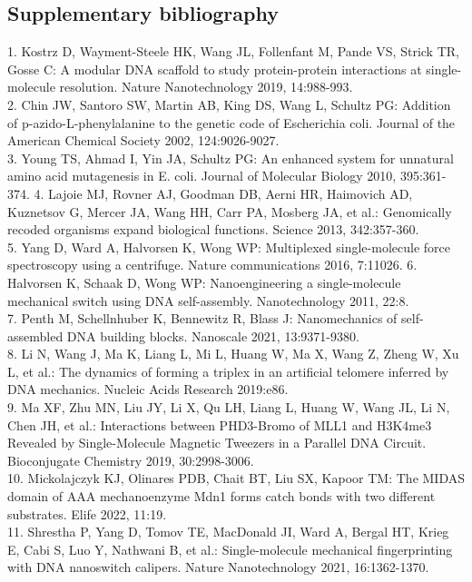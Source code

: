 \documentclass{biophys-new}
\begin{document}
\FloatBarrier

\newpage

\subsection*{Supplementary bibliography}

1. Kostrz D, Wayment-Steele HK, Wang JL, Follenfant M, Pande VS, Strick TR, Gosse C: A modular DNA scaffold to study protein-protein interactions at single-molecule resolution. Nature Nanotechnology 2019, 14:988-993.\\
2. Chin JW, Santoro SW, Martin AB, King DS, Wang L, Schultz PG: Addition of p-azido-L-phenylalanine to the genetic code of Escherichia coli. Journal of the American Chemical Society 2002, 124:9026-9027.\\
3. Young TS, Ahmad I, Yin JA, Schultz PG: An enhanced system for unnatural amino acid mutagenesis in E. coli. Journal of Molecular Biology 2010, 395:361-374.
4. Lajoie MJ, Rovner AJ, Goodman DB, Aerni HR, Haimovich AD, Kuznetsov G, Mercer JA, Wang HH, Carr PA, Mosberg JA, et al.: Genomically recoded organisms expand biological functions. Science 2013, 342:357-360.\\
5. Yang D, Ward A, Halvorsen K, Wong WP: Multiplexed single-molecule force spectroscopy using a centrifuge. Nature communications 2016, 7:11026.
6. Halvorsen K, Schaak D, Wong WP: Nanoengineering a single-molecule mechanical switch using DNA self-assembly. Nanotechnology 2011, 22:8.\\
7. Penth M, Schellnhuber K, Bennewitz R, Blass J: Nanomechanics of self-assembled DNA building blocks. Nanoscale 2021, 13:9371-9380.\\
8. Li N, Wang J, Ma K, Liang L, Mi L, Huang W, Ma X, Wang Z, Zheng W, Xu L, et al.: The dynamics of forming a triplex in an artificial telomere inferred by DNA mechanics. Nucleic Acids Research 2019:e86.\\
9. Ma XF, Zhu MN, Liu JY, Li X, Qu LH, Liang L, Huang W, Wang JL, Li N, Chen JH, et al.: Interactions between PHD3-Bromo of MLL1 and H3K4me3 Revealed by Single-Molecule Magnetic Tweezers in a Parallel DNA Circuit. Bioconjugate Chemistry 2019, 30:2998-3006.\\
10. Mickolajczyk KJ, Olinares PDB, Chait BT, Liu SX, Kapoor TM: The MIDAS domain of AAA mechanoenzyme Mdn1 forms catch bonds with two different substrates. Elife 2022, 11:19.\\
11. Shrestha P, Yang D, Tomov TE, MacDonald JI, Ward A, Bergal HT, Krieg E, Cabi S, Luo Y, Nathwani B, et al.: Single-molecule mechanical fingerprinting with DNA nanoswitch calipers. Nature Nanotechnology 2021, 16:1362-1370.\\
\end{document}
